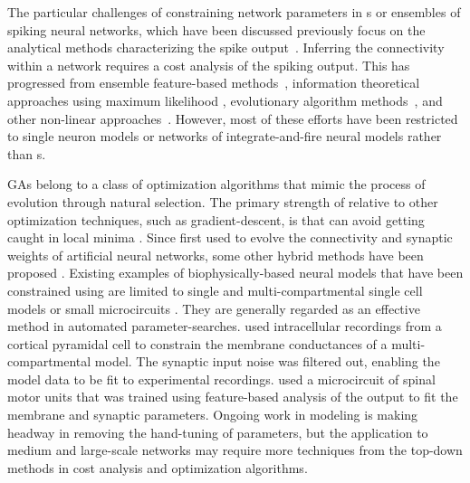 \smallskip{} 

The particular challenges of constraining network parameters in {\BNN}s
or ensembles of spiking neural networks, which have been discussed
previously \citep{EggertHemmen:2001,Brette:2007} focus on the
analytical methods characterizing the spike output~\citep{Victor:2005,KostalLanskyEtAl:2007,BrownKassEtAl:2004}. Inferring
the connectivity within a network requires a cost analysis of the
spiking output.  This has progressed from ensemble feature-based
methods~\citep{SameshimaBaccala:1999,DahlhausEichlerEtAl:1997,TheunissenSenEtAl:2000},
information theoretical approaches using maximum likelihood
\citep{YamadaMatsumotoEtAl:1996,Chichilnisky:2001,OkatanWilsonEtAl:2005,PaninskiPillowEtAl:2004},
evolutionary algorithm methods~\citep{TakahamaSakai:2005,Yao:1999},
and other non-linear approaches~\citep{Eblen-ZajjurSalasEtAl:1999}.
However, most of these efforts have been restricted to single neuron
models or networks of integrate-and-fire neural models rather than
{\BNN}s.

\smallskip{} 

\glspl{GA} belong to a class of optimization algorithms
that mimic the process of evolution through natural selection. The
primary strength of {\GAs} relative to other optimization techniques,
such as gradient-descent, is that {\GAs} can avoid getting caught in
local minima \citep{Goldberg:1989,Whitley:1995}. Since
\citet{Holland:1975} first used {\GAs} to evolve the connectivity and
synaptic weights of artificial neural networks, some other hybrid
methods have been proposed \citep{Yao:1999,Whitley:1995}. Existing
examples of biophysically-based neural models that have been
constrained using {\GAs} are limited to single and multi-compartmental
single cell models \citep{KerenPeledEtAl:2005,VanierBower:1999,VanDeEtAl:2008} or small
microcircuits \citep{TaylorEnoka:2004}.  They are generally regarded
as an effective method in automated
parameter-searches. \citet{KerenPeledEtAl:2005} used intracellular
recordings from a cortical pyramidal cell to constrain the membrane
conductances of a multi-compartmental model.  The synaptic input noise
was filtered out, enabling the model data to be fit to experimental
recordings. \citet{TaylorEnoka:2004} used a microcircuit of spinal
motor units that was trained using feature-based analysis of the
output to fit the membrane and synaptic parameters.  Ongoing work in
{\BNN} modeling \citep{VanierBower:1999,VanDeEtAl:2008} is making headway
in removing the hand-tuning of parameters, but the application to
medium and large-scale networks may require more techniques from the
top-down methods in cost analysis and optimization algorithms.

